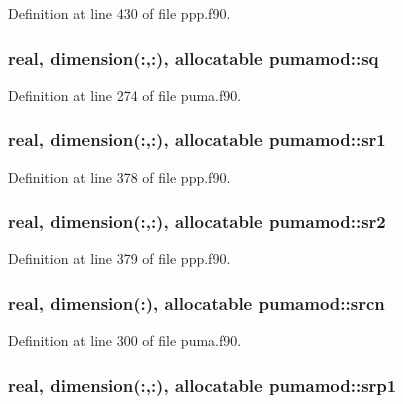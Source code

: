 \-Definition at line 430 of file ppp.\-f90.

\hypertarget{classpumamod_a02a75a47225d636193b203a0d7ccc4ee}{
\subsubsection[{sq}]{\setlength{\rightskip}{0pt plus 5cm}real, dimension(\-:,\-:), allocatable {\bf pumamod\-::sq}}}
\label{classpumamod_a02a75a47225d636193b203a0d7ccc4ee}


\-Definition at line 274 of file puma.\-f90.

\hypertarget{classpumamod_a3eb3e9be54dfc5066878573e5bac8386}{
\subsubsection[{sr1}]{\setlength{\rightskip}{0pt plus 5cm}real, dimension(\-:,\-:), allocatable {\bf pumamod\-::sr1}}}
\label{classpumamod_a3eb3e9be54dfc5066878573e5bac8386}


\-Definition at line 378 of file ppp.\-f90.

\hypertarget{classpumamod_ae778b35555f5b6530d47f7cb75422a94}{
\subsubsection[{sr2}]{\setlength{\rightskip}{0pt plus 5cm}real, dimension(\-:,\-:), allocatable {\bf pumamod\-::sr2}}}
\label{classpumamod_ae778b35555f5b6530d47f7cb75422a94}


\-Definition at line 379 of file ppp.\-f90.

\hypertarget{classpumamod_a98103b850b9c24c95bac646961ae0209}{
\subsubsection[{srcn}]{\setlength{\rightskip}{0pt plus 5cm}real, dimension(\-:), allocatable {\bf pumamod\-::srcn}}}
\label{classpumamod_a98103b850b9c24c95bac646961ae0209}


\-Definition at line 300 of file puma.\-f90.

\hypertarget{classpumamod_a610ade488da8477514d377f4d3113078}{
\subsubsection[{srp1}]{\setlength{\rightskip}{0pt plus 5cm}real, dimension(\-:,\-:), allocatable {\bf pumamod\-::srp1}}}
\label{classpumamod_a610ade488da8477514d377f4d3113078}


